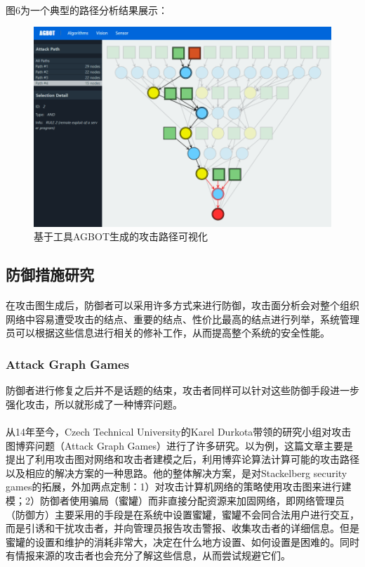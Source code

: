\documentclass[12pt,a4paper]{article}
\begin{document}
\paragraph{}
图6为一个典型的路径分析结果展示：
\begin{figure}[!htp]
	\centering
	\includegraphics[scale=0.40]{images/paths.png} 
	\caption{基于工具AGBOT生成的攻击路径可视化}
\end{figure}


\subsection{防御措施研究}

\paragraph{}
在攻击图生成后，防御者可以采用许多方式来进行防御，攻击面分析会对整个组织网络中容易遭受攻击的结点、重要的结点、性价比最高的结点进行列举，系统管理员可以根据这些信息进行相关的修补工作，从而提高整个系统的安全性能。

\subsubsection{Attack Graph Games}
防御者进行修复之后并不是话题的结束，攻击者同样可以针对这些防御手段进一步强化攻击，所以就形成了一种博弈问题。
\paragraph{}
从14年至今，Czech Technical University的Karel Durkota带领的研究小组对攻击图博弈问题（Attack Graph Games）进行了许多研究\cite{18}\cite{19}\cite{20}\cite{21}\cite{22}\cite{23}。以\cite{19}为例，这篇文章主要是提出了利用攻击图对网络和攻击者建模之后，利用博弈论算法计算可能的攻击路径以及相应的解决方案的一种思路。他的整体解决方案，是对Stackelberg security games的拓展，外加两点定制：1）对攻击计算机网络的策略使用攻击图来进行建模；2）防御者使用骗局（蜜罐）而非直接分配资源来加固网络，即网络管理员（防御方）主要采用的手段是在系统中设置蜜罐，蜜罐不会同合法用户进行交互，而是引诱和干扰攻击者，并向管理员报告攻击警报、收集攻击者的详细信息。但是蜜罐的设置和维护的消耗非常大，决定在什么地方设置、如何设置是困难的。同时有情报来源的攻击者也会充分了解这些信息，从而尝试规避它们。
\end{document}
